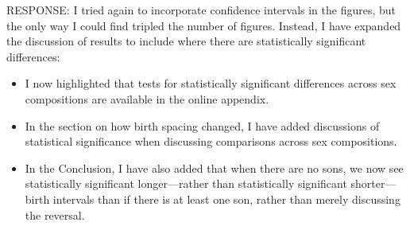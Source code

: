 \documentclass[letterpaper,12pt]{article}
\begin{document}
\begin{enumerate}[resume]
RESPONSE: I tried again to incorporate confidence intervals in the figures, but the only 
way I could find tripled the number of figures.
Instead, I have expanded the discussion of results to include where there are statistically
significant differences:
\begin{itemize}
\item I now highlighted that tests for statistically significant differences across sex compositions 
are available in the online appendix.
\item In the section on how birth spacing changed, I have added discussions of statistical significance 
when discussing comparisons across sex compositions.
\item In the Conclusion, I have also added that when there are no sons, we now see statistically 
significant longer---rather than statistically significant shorter---birth intervals than 
if there is at least one son, rather than merely discussing the reversal.
\end{itemize}

\end{enumerate}


\newpage


\end{document}
